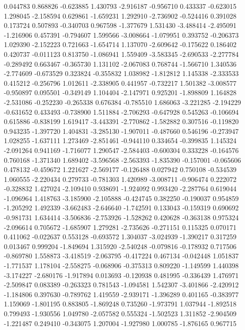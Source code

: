 0.044783
0.868826
-0.623885
1.430793
-2.916187
-0.956710
0.433337
-0.623015
1.298045
-2.158594
0.629861
-1.659231
1.292910
-2.736902
-0.524416
0.391028
0.173724
0.507893
-0.340703
0.967598
-1.377679
1.531430
-3.488414
-2.495091
-1.216906
0.457391
-0.794607
1.599566
-3.008664
-1.079951
0.393752
-0.206373
1.029390
-2.152223
0.721663
-1.654714
1.137070
-2.609642
-0.175622
0.186402
0.420737
-0.011123
0.813750
-1.086941
1.559409
-3.583345
-2.690533
-2.277784
-0.289492
0.663467
-0.365730
1.131102
-2.067083
0.768744
-1.566710
1.340536
-2.774609
-0.673529
0.323824
-0.355832
1.038982
-1.812812
1.145338
-2.333533
0.415212
-0.256796
1.012611
-2.338905
0.441957
-0.732217
1.501382
-3.008577
-0.950897
0.095501
-0.349149
1.104404
-2.147971
0.925201
-1.898809
1.164828
-2.531086
-0.252230
-0.265338
0.676384
-0.785510
1.686063
-3.221285
-2.194229
-0.631652
0.433493
-0.738900
1.511884
-2.706293
-0.647928
0.545263
-0.106694
0.615886
-0.838199
1.619417
-3.443391
-2.770862
-1.582882
0.307516
-0.119820
0.943235
-1.397720
1.404831
-3.285130
-1.907011
-0.487660
0.546196
-0.273947
1.028255
-1.637111
1.273469
-2.851461
-0.944110
0.334654
-0.399835
1.145324
-2.091264
0.941169
-1.716077
1.290547
-2.584403
-0.600304
0.333228
-0.164576
0.760168
-1.371340
1.689402
-3.596568
-2.563393
-1.835390
-0.157001
-0.065606
0.478132
-0.459672
1.221627
-2.569177
-0.126488
0.027942
0.750108
-0.534539
1.060555
-2.220434
0.279733
-0.781303
1.420989
-3.008711
-0.906474
0.222072
-0.328832
1.427024
-2.109410
0.938691
-1.924092
0.993420
-2.287764
0.619044
-1.096964
1.418763
-3.185900
-2.105888
-0.424745
0.382250
-0.190037
0.954859
-1.205292
1.492339
-3.662483
-2.646640
-1.742591
0.133043
-0.159319
0.690692
-0.981731
1.634414
-3.506836
-2.753926
-1.528262
0.420628
-0.363138
0.975324
-2.096614
0.705672
-1.685907
1.279281
-2.735626
-0.271151
0.115325
0.070171
0.411062
-0.022637
0.553128
-0.693572
1.304037
-3.024939
-1.390217
0.317259
0.013467
0.999204
-1.849694
1.315920
-2.540248
-0.079816
-0.178932
0.717506
-0.869780
1.558873
-3.418519
-2.063795
-0.417224
0.467134
-0.042448
1.051837
-1.771537
1.178104
-2.558275
-0.068906
-0.375313
0.809220
-1.149599
1.440398
-3.174227
-2.680176
-1.917894
0.013693
-0.120938
0.481995
-0.336439
1.476971
-2.509847
0.083389
-0.263323
0.781543
-1.094581
1.542307
-3.401866
-2.420912
-1.184806
0.397630
-0.789762
1.419559
-2.939171
-1.396289
0.401165
-0.383977
1.159069
-1.801195
0.883805
-1.869248
0.735260
-1.973791
1.037944
-1.892518
0.799493
-1.930556
1.049780
-2.057582
0.555324
-1.502523
1.311852
-2.904509
-1.221487
0.249410
-0.343075
1.207004
-1.927980
1.000785
-1.876165
0.967715
